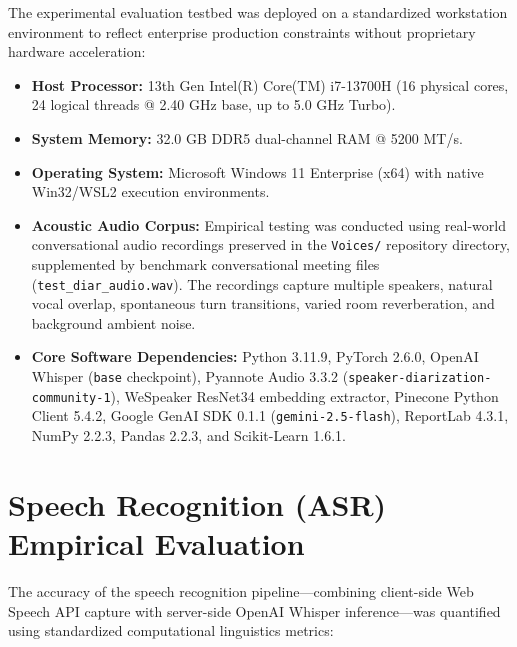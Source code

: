 \documentclass[12pt,oneside,letterpaper]{report}
\numberwithin{equation}{chapter} %
\begin{document}
The experimental evaluation testbed was deployed on a standardized workstation environment to reflect enterprise production constraints without proprietary hardware acceleration:
\begin{itemize}
    \item \textbf{Host Processor:} 13th Gen Intel(R) Core(TM) i7-13700H (16 physical cores, 24 logical threads @ 2.40 GHz base, up to 5.0 GHz Turbo).
    \item \textbf{System Memory:} 32.0 GB DDR5 dual-channel RAM @ 5200 MT/s.
    \item \textbf{Operating System:} Microsoft Windows 11 Enterprise (x64) with native Win32/WSL2 execution environments.
    \item \textbf{Acoustic Audio Corpus:} Empirical testing was conducted using real-world conversational audio recordings preserved in the \texttt{Voices/} repository directory, supplemented by benchmark conversational meeting files (\texttt{test\_diar\_audio.wav}). The recordings capture multiple speakers, natural vocal overlap, spontaneous turn transitions, varied room reverberation, and background ambient noise.
    \item \textbf{Core Software Dependencies:} Python 3.11.9, PyTorch 2.6.0, OpenAI Whisper (\texttt{base} checkpoint), Pyannote Audio 3.3.2 (\texttt{speaker-diarization-community-1}), WeSpeaker ResNet34 embedding extractor, Pinecone Python Client 5.4.2, Google GenAI SDK 0.1.1 (\texttt{gemini-2.5-flash}), ReportLab 4.3.1, NumPy 2.2.3, Pandas 2.2.3, and Scikit-Learn 1.6.1.
\end{itemize}

\section{Speech Recognition (ASR) Empirical Evaluation}
The accuracy of the speech recognition pipeline---combining client-side Web Speech API capture with server-side OpenAI Whisper inference---was quantified using standardized computational linguistics metrics:
\end{document}
